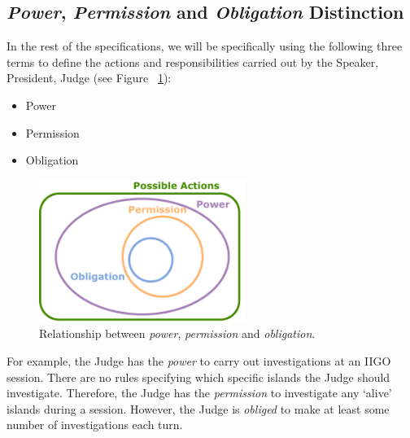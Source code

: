 \subsection{\emph{Power}, \emph{Permission} and \emph{Obligation} Distinction}
In the rest of the specifications, we will be specifically using the following three terms to define the actions and responsibilities carried out by the Speaker, President, Judge (see Figure~ \ref{fig:per_obl_sets}):
\begin{itemize}
    \item Power
    \item Permission
    \item Obligation
\end{itemize}



\begin{figure}[H] 
\centering
\includegraphics[width=0.6\textwidth]{05_iigo/images/SOMAS_per_obl.pdf}
\caption{Relationship between \emph{power}, \emph{permission} and \emph{obligation}.}
\label{fig:per_obl_sets}
\end{figure} 


For example, the Judge has the \emph{power} to carry out investigations at an IIGO session. There are no rules specifying which specific islands the Judge should investigate. Therefore, the Judge has the \emph{permission} to investigate any `alive' islands during a session. However, the Judge is \emph{obliged} to make at least some number of investigations each turn.



